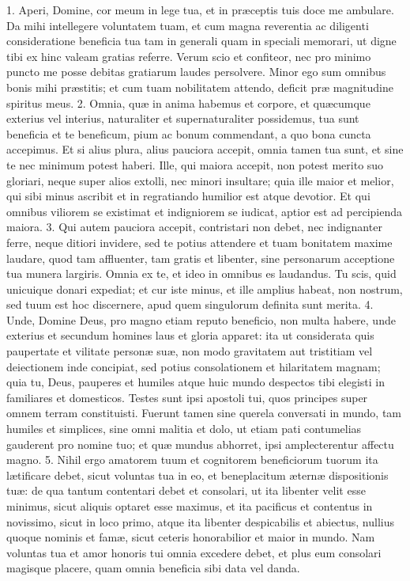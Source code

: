 \documentclass[twoside]{article}
\begin{document}
1. Aperi, Domine, cor meum in lege tua, et in præceptis tuis doce me ambulare. Da mihi intellegere voluntatem tuam, et cum magna reverentia ac diligenti consideratione beneficia tua tam in generali quam in speciali memorari, ut digne tibi ex hinc valeam gratias referre. Verum scio et confiteor, nec pro minimo puncto me posse debitas gratiarum laudes persolvere. Minor ego sum omnibus bonis mihi præstitis; et cum tuam nobilitatem attendo, deficit præ magnitudine spiritus meus.
2. Omnia, quæ in anima habemus et corpore, et quæcumque exterius vel interius, naturaliter et supernaturaliter possidemus, tua sunt beneficia et te beneficum, pium ac bonum commendant, a quo bona cuncta accepimus. Et si alius plura, alius pauciora accepit, omnia tamen tua sunt, et sine te nec minimum potest haberi. Ille, qui maiora accepit, non potest merito suo gloriari, neque super alios extolli, nec minori insultare; quia ille maior et melior, qui sibi minus ascribit et in regratiando humilior est atque devotior. Et qui omnibus viliorem se existimat et indigniorem se iudicat, aptior est ad percipienda maiora.
3. Qui autem pauciora accepit, contristari non debet, nec indignanter ferre, neque ditiori invidere, sed te potius attendere et tuam bonitatem maxime laudare, quod tam affluenter, tam gratis et libenter, sine personarum acceptione tua munera largiris. Omnia ex te, et ideo in omnibus es laudandus. Tu scis, quid unicuique donari expediat; et cur iste minus, et ille amplius habeat, non nostrum, sed tuum est hoc discernere, apud quem singulorum definita sunt merita.
4. Unde, Domine Deus, pro magno etiam reputo beneficio, non multa habere, unde exterius et secundum homines laus et gloria apparet: ita ut considerata quis paupertate et vilitate personæ suæ, non modo gravitatem aut tristitiam vel deiectionem inde concipiat, sed potius consolationem et hilaritatem magnam; quia tu, Deus, pauperes et humiles atque huic mundo despectos tibi elegisti in familiares et domesticos. Testes sunt ipsi apostoli tui, quos principes super omnem terram constituisti. Fuerunt tamen sine querela conversati in mundo, tam humiles et simplices, sine omni malitia et dolo, ut etiam pati contumelias gauderent pro nomine tuo; et quæ mundus abhorret, ipsi amplecterentur affectu magno.
5. Nihil ergo amatorem tuum et cognitorem beneficiorum tuorum ita lætificare debet, sicut voluntas tua in eo, et beneplacitum æternæ dispositionis tuæ: de qua tantum contentari debet et consolari, ut ita libenter velit esse minimus, sicut aliquis optaret esse maximus, et ita pacificus et contentus in novissimo, sicut in loco primo, atque ita libenter despicabilis et abiectus, nullius quoque nominis et famæ, sicut ceteris honorabilior et maior in mundo. Nam voluntas tua et amor honoris tui omnia excedere debet, et plus eum consolari magisque placere, quam omnia beneficia sibi data vel danda.
\end{document}
